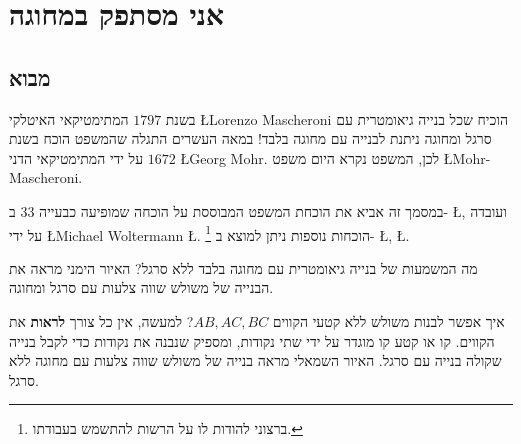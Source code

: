 



\chapter{אני מסתפק במחוגה}\label{c.compass-only}


\section{%
מבוא
}\label{s.intro}
בשנת
$1797$
המתימטיקאי האיטלקי
\L{Lorenzo Mascheroni}
הוכיח שכל בנייה גיאומטרית עם סרגל ומחוגה ניתנת לבנייה עם מחוגה בלבד! במאה העשרים התגלה שהמשפט הוכח בשנת
$1672$
על ידי המתימטיקאי הדני
\L{Georg Mohr}.
לכן, המשפט נקרא היום משפט
\L{Mohr-Mascheroni}.

במסמך זה אביא את הוכחת המשפט המבוססת על הוכחה שמופיעה כבעייה
$33$
ב-%
\L{\cite{dorrie1}},
ועובדה על ידי
\L{Michael Woltermann} \L{\cite{dorrie2}}.%
\footnote{%
ברצוני להודות לו על הרשות להתשמש בעבודתו.
}
הוכחות נוספות ניתן למוצא ב-%
\L{\cite{mm}}, \L{\cite{stopel}}.

מה המשמעות של בנייה גיאומטרית עם מחוגה בלבד ללא סרגל? האיור הימני מראה את הבנייה של משולש שווה צלעות עם סרגל ומחוגה.
\begin{center}
\end{center}
איך אפשר לבנות משולש ללא קטעי הקווים
$AB,AC,BC$?
למעשה, אין כל צורך
\textbf{לראות}
את הקווים. קו או קטע קו מוגדר על ידי שתי נקודות, ומספיק שנבנה את נקודות כדי לקבל בנייה שקולה בנייה עם סרגל. האיור השמאלי מראה בנייה של משולש שווה צלעות עם מחוגה ללא סרגל.

